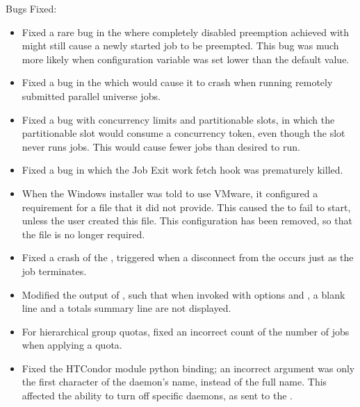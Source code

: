 \noindent Bugs Fixed:

\begin{itemize}

\item Fixed a rare bug in the  where 
completely disabled preemption achieved with
might still cause a newly started job to be preempted.  
This bug was much more likely when
configuration variable  was set lower 
than the default value.

\item Fixed a bug in the  which would cause it
to crash when running remotely submitted parallel universe jobs.

\item Fixed a bug with concurrency limits and partitionable slots,
in which the partitionable slot would consume a concurrency token,
even though the slot never runs jobs.  This would cause fewer jobs
than desired to run.

\item Fixed a bug in which the Job Exit work fetch hook was prematurely killed.

\item When the Windows installer was told to use VMware,
it configured a requirement for a 
 file that it did not provide.
This caused the  to fail to start,
unless the user created this file.
This configuration has been removed, so that the file is no longer required. 

\item Fixed a crash of the , triggered when a disconnect
from the  occurs just as the job terminates.

\item Modified the output of ,
such that when invoked with options  and ,
a blank line and a totals summary line are not displayed.

\item For hierarchical group quotas, 
fixed an incorrect count of the number of jobs when applying a quota.

\item Fixed the HTCondor module  python binding;
an incorrect argument was only the first character of the daemon's name,
instead of the full name. 
This affected the ability to turn off specific daemons,
as sent to the .


\end{itemize}
